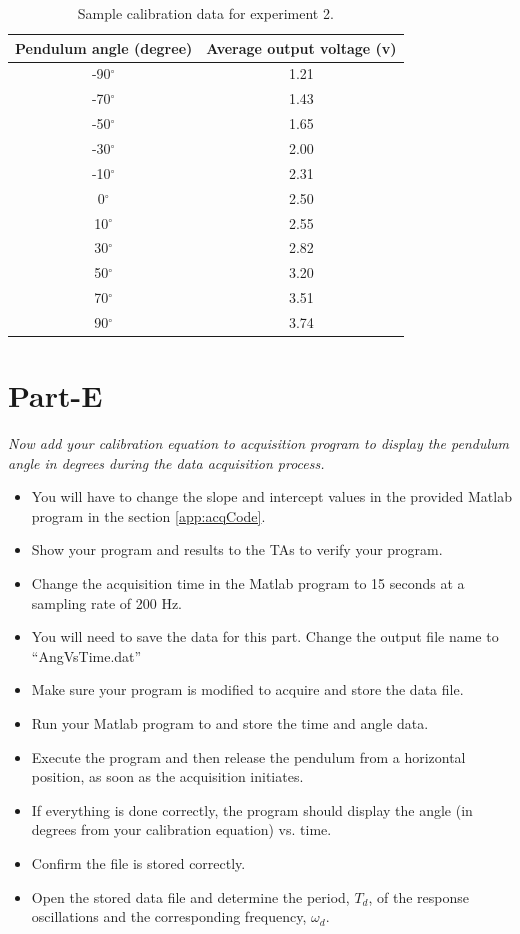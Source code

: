 \documentclass{article} %
\begin{document}
\begin{table}[!ht]
\centering
\caption{Sample calibration data for experiment 2.}
\begin{tabular}{c c}
\toprule
Pendulum angle (degree) & Average output voltage (v) \\ \hline
-90$^\circ$ & 1.21\\
-70$^\circ$ & 1.43\\
-50$^\circ$ & 1.65 \\
-30$^\circ$ & 2.00\\
-10$^\circ$ & 2.31\\
0$^\circ$  & 2.50\\
10$^\circ$ & 2.55\\
30$^\circ$ & 2.82\\
50$^\circ$ & 3.20\\
70$^\circ$ & 3.51\\
90$^\circ$ & 3.74\\
\bottomrule
\end{tabular}
\label{tab:Table01}
\end{table}

\section{Part-E}
\emph{Now add your calibration equation to acquisition program to display the pendulum angle in degrees during the data acquisition process. }
\begin{itemize}
\item You will have to change the slope and intercept values in the provided Matlab program in the section \ref{app:acqCode}.
\item Show your program and results to the TAs to verify your program. 
\item Change the acquisition time in the Matlab program to 15 seconds at a sampling rate of 200 Hz.
\item You will need to save the data for this part. Change the output file name to ``AngVsTime.dat''
\item Make sure your program is modified to acquire and store the data file.
\item Run your Matlab program to and store the time and angle data.
\item Execute the program and then release the pendulum from a horizontal position, as soon as the acquisition initiates. 
\item If everything is done correctly, the program should display the angle (in degrees from your calibration equation) vs. time.  
\item Confirm the file is stored correctly.
\item Open the stored data file and determine the period, $T_d$, of the response oscillations and the corresponding frequency, $\omega_d$.
\end{itemize}
\end{document}
